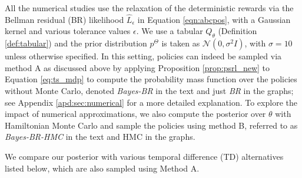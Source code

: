 \documentclass{amsart}
\begin{document}
All the numerical studies use the relaxation of the deterministic rewards via the Bellman residual (BR) likelihood $\hat{L}_{\epsilon}$ in Equation \ref{eqn:abcpos}, with a Gaussian kernel and various tolerance values $\epsilon$. We use a tabular $Q_\theta$ (Definition \ref{def:tabular}) and the prior distribution $p^\Theta$ is taken as $\mathcal{N}(0,\sigma^2 I)$, with $\sigma=10$ unless otherwise specified. In this setting, policies can indeed be sampled via method A as discussed above by applying Proposition \ref{prop:psrl_new} to Equation \ref{eq:ts_mdp} to compute the probability mass function over the policies without Monte Carlo, denoted {\it Bayes-BR} in the text and just {\it BR} in the graphs; see Appendix \ref{apd:sec:numerical} for a more detailed explanation. To explore the impact of numerical approximations, we also compute the posterior over $\theta$ with Hamiltonian Monte Carlo \citep{hmcneal} and sample the policies using method B, referred to as {\it Bayes-BR-HMC} in the text and HMC in the graphs.

 We compare our posterior with various temporal difference (TD) alternatives listed below, which are also sampled using Method A.
\end{document}
